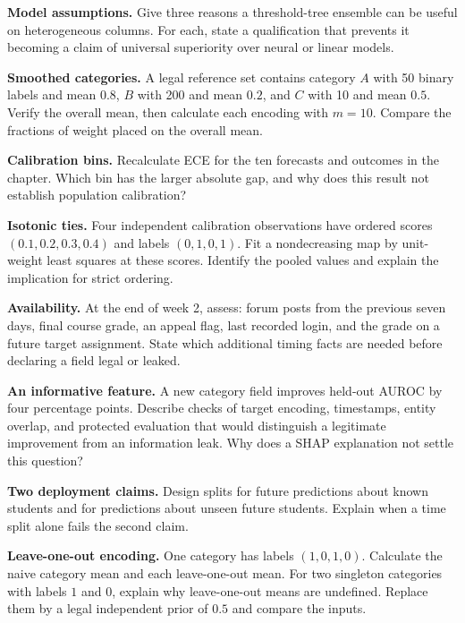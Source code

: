 \begin{exercises}
\item \textbf{Model assumptions.} Give three reasons a threshold-tree ensemble can be useful on heterogeneous columns. For each, state a qualification that prevents it becoming a claim of universal superiority over neural or linear models.
\item \textbf{Smoothed categories.} A legal reference set contains category $A$ with 50 binary labels and mean $0.8$, $B$ with 200 and mean $0.2$, and $C$ with 10 and mean $0.5$. Verify the overall mean, then calculate each encoding with $m=10$. Compare the fractions of weight placed on the overall mean.
\item \textbf{Calibration bins.} Recalculate ECE for the ten forecasts and outcomes in the chapter. Which bin has the larger absolute gap, and why does this result not establish population calibration?
\item \textbf{Isotonic ties.} Four independent calibration observations have ordered scores $(0.1,0.2,0.3,0.4)$ and labels $(0,1,0,1)$. Fit a nondecreasing map by unit-weight least squares at these scores. Identify the pooled values and explain the implication for strict ordering.
\item \textbf{Availability.} At the end of week 2, assess: forum posts from the previous seven days, final course grade, an appeal flag, last recorded login, and the grade on a future target assignment. State which additional timing facts are needed before declaring a field legal or leaked.
\item \textbf{An informative feature.} A new category field improves held-out AUROC by four percentage points. Describe checks of target encoding, timestamps, entity overlap, and protected evaluation that would distinguish a legitimate improvement from an information leak. Why does a SHAP explanation not settle this question?
\item \textbf{Two deployment claims.} Design splits for future predictions about known students and for predictions about unseen future students. Explain when a time split alone fails the second claim.
\item \textbf{Leave-one-out encoding.} One category has labels $(1,0,1,0)$. Calculate the naive category mean and each leave-one-out mean. For two singleton categories with labels $1$ and $0$, explain why leave-one-out means are undefined. Replace them by a legal independent prior of $0.5$ and compare the inputs.

\end{exercises}
